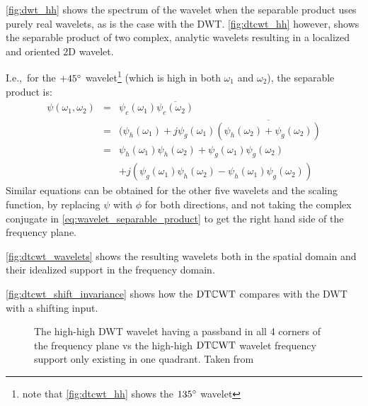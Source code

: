   \autoref{fig:dwt_hh} shows the spectrum of
  the wavelet when the separable product uses purely real wavelets, as is the
  case with the DWT\@. \autoref{fig:dtcwt_hh} however, shows the separable
  product of two complex, analytic wavelets resulting in a localized and
  oriented 2D wavelet.  
  
  I.e.,\ for the $+45^{\circ}$ wavelet\footnote{note that \autoref{fig:dtcwt_hh}
  shows the $135^{\circ}$ wavelet} (which is high
  in both $\omega_1$ and $\omega_2$), the separable product is:
  \begin{eqnarray}
    \psi(\omega_1,\omega_2) & = & \psi_c (\omega_1) \overline{\psi_c
      (\omega_2) } \label{eq:wavelet_separable_product}\\
    & = & (\psi_h(\omega_1) + j \psi_g(\omega_1) \overline{\left(\psi_h(\omega_2)
      + \psi_g(\omega_2) \right)} \nonumber\\
    & = & \psi_h(\omega_1) \psi_h(\omega_2) + \psi_g(\omega_1)
      \psi_g(\omega_2)\nonumber\\
    &&  + j\left( \psi_g(\omega_1) \psi_h(\omega_2) - \psi_h(\omega_1)
        \psi_g(\omega_2) \right)  \label{eq:dtcwt_2d_product}
  \end{eqnarray}
  Similar equations can be obtained for the other five wavelets and the scaling
  function, by replacing
  $\psi$ with $\phi$ for both directions, and not taking the complex conjugate
  in \autoref{eq:wavelet_separable_product} to get the right hand side of the
  frequency plane. 
  
  \autoref{fig:dtcwt_wavelets} shows the resulting wavelets both in the spatial
  domain and their idealized support in the frequency domain.

  \autoref{fig:dtcwt_shift_invariance} shows how the $\DTCWT$ compares with the
  DWT with a shifting input.

  \begin{figure}
      \subfloat[]{\makebox[\textwidth][c]{%
        \label{fig:dwt_hh}}}
      \newline
      \subfloat[]{\makebox[\textwidth][c]{%
        \label{fig:dtcwt_hh}}}
      \caption[The DWT high-high vs the $\DTCWT$ high-high frequency support]
              { The high-high DWT wavelet having a passband in
              all 4 corners of the frequency plane vs  the
              high-high $\DTCWT$ wavelet frequency support only existing in one
              quadrant. Taken from \citep{selesnick_dual-tree_2005}}
      \label{fig:dwt_dtcwt_hh}
  \end{figure}

